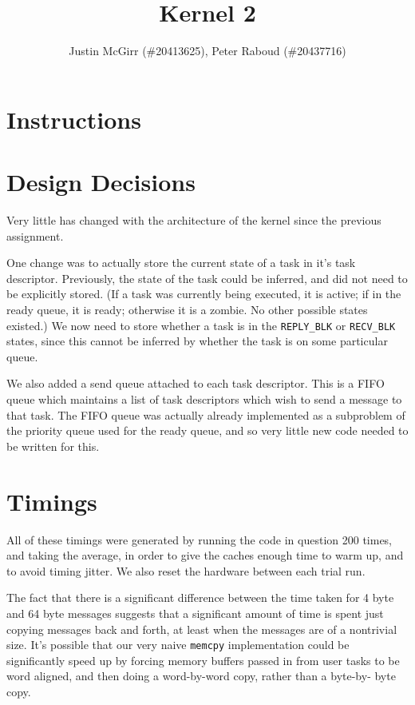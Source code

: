 \documentclass[titlepage]{article}
\begin{document}
\title{Kernel 2}
\author{Justin McGirr (\#20413625), Peter Raboud (\#20437716)}
\maketitle

\section{Instructions}

\section{Design Decisions}
Very little has changed with the architecture of the kernel since the previous assignment.

One change was to actually store the current state of a task in it's task descriptor.
Previously, the state of the task could be inferred, and did not need to be explicitly stored.
(If a task was currently being executed, it is active; if in the ready queue, it is ready; otherwise
it is a zombie. No other possible states existed.)
We now need to store whether a task is in the \texttt{REPLY\_BLK} or \texttt{RECV\_BLK} states,
since this cannot be inferred by whether the task is on some particular queue.

We also added a send queue attached to each task descriptor.
This is a FIFO queue which maintains a list of task descriptors which wish to send a message
to that task.
The FIFO queue was actually already implemented as a subproblem of the priority queue used
for the ready queue, and so very little new code needed to be written for this.

\section{Timings}
All of these timings were generated by running the code in question 200 times,
and taking the average, in order to give the caches enough time to warm up, and
to avoid timing jitter.
We also reset the hardware between each trial run.



The fact that there is a significant difference between the time taken for 4
byte and 64 byte messages suggests that a significant amount of time is spent
just copying messages back and forth, at least when the messages are of a
nontrivial size. It's possible that our very naive \texttt{memcpy} implementation could
be significantly speed up by forcing memory buffers passed in from user tasks
to be word aligned, and then doing a word-by-word copy, rather than a byte-by-
byte copy.
\end{document}
